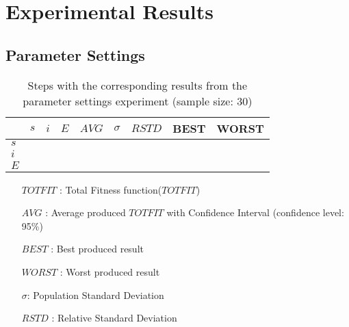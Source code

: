 \chapter{Experimental Results}
\label{appendixC}

\section{Parameter Settings}

\begin{sidewaystable}
    \begin{tabular}{|l|l|l|c||c|c|c|c|c|}
    \hline
    ~ & $s$ & $i$ & $E$ & $AVG$ & $\sigma$ & $RSTD$ & BEST & WORST \\
    \hline
    $s$ \\

    \hline
    $i$ \\
 
    \hline
    $E$ \\
  
    \hline
    \end{tabular}
    \caption {Steps with the corresponding results from the parameter settings experiment (sample size: 30)}
    \tiny
    \begin{itemize}[noitemsep]
    \item[$TOTFIT$ :] Total Fitness function($TOTFIT$)
    \item[$AVG$ :] Average produced $TOTFIT$ with Confidence Interval (confidence level: 95\%)
    \item[$BEST$ :] Best produced result
    \item[$WORST$ :] Worst produced result
    \item[$\sigma$:] Population Standard Deviation 
    \item[$RSTD$ :] Relative Standard Deviation 
    \end{itemize}
    \label{table:pm1}
\end{sidewaystable}

